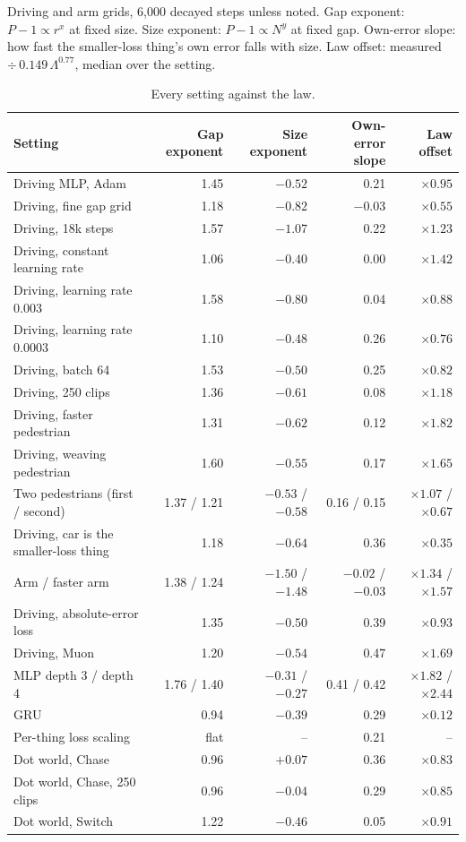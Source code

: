 \documentclass[11pt]{article}
\newcommand{\Lam}{\Lambda}
\begin{document}
Driving and arm grids, 6,000 decayed steps unless noted. Gap exponent: $P-1\propto r^x$ at fixed size. Size exponent: $P-1\propto N^y$ at fixed gap. Own-error slope: how fast the smaller-loss thing's own error falls with size. Law offset: measured $\div\, 0.149\,\Lam^{0.77}$, median over the setting.

\begin{table}[h]
\centering\small
\caption{Every setting against the law.}
\label{tab:appA}
\begin{tabular}{@{}lrrrr@{}}
\toprule
Setting & Gap exponent & Size exponent & Own-error slope & Law offset \\
\midrule
Driving MLP, Adam & 1.45 & $-0.52$ & 0.21 & $\times0.95$ \\
Driving, fine gap grid & 1.18 & $-0.82$ & $-0.03$ & $\times0.55$ \\
Driving, 18k steps & 1.57 & $-1.07$ & 0.22 & $\times1.23$ \\
Driving, constant learning rate & 1.06 & $-0.40$ & 0.00 & $\times1.42$ \\
Driving, learning rate 0.003 & 1.58 & $-0.80$ & 0.04 & $\times0.88$ \\
Driving, learning rate 0.0003 & 1.10 & $-0.48$ & 0.26 & $\times0.76$ \\
Driving, batch 64 & 1.53 & $-0.50$ & 0.25 & $\times0.82$ \\
Driving, 250 clips & 1.36 & $-0.61$ & 0.08 & $\times1.18$ \\
Driving, faster pedestrian & 1.31 & $-0.62$ & 0.12 & $\times1.82$ \\
Driving, weaving pedestrian & 1.60 & $-0.55$ & 0.17 & $\times1.65$ \\
Two pedestrians (first / second) & 1.37 / 1.21 & $-0.53$ / $-0.58$ & 0.16 / 0.15 & $\times1.07$ / $\times0.67$ \\
Driving, car is the smaller-loss thing & 1.18 & $-0.64$ & 0.36 & $\times0.35$ \\
Arm / faster arm & 1.38 / 1.24 & $-1.50$ / $-1.48$ & $-0.02$ / $-0.03$ & $\times1.34$ / $\times1.57$ \\
Driving, absolute-error loss & 1.35 & $-0.50$ & 0.39 & $\times0.93$ \\
Driving, Muon & 1.20 & $-0.54$ & 0.47 & $\times1.69$ \\
MLP depth 3 / depth 4 & 1.76 / 1.40 & $-0.31$ / $-0.27$ & 0.41 / 0.42 & $\times1.82$ / $\times2.44$ \\
GRU & 0.94 & $-0.39$ & 0.29 & $\times0.12$ \\
Per-thing loss scaling & flat & -- & 0.21 & -- \\
Dot world, Chase & 0.96 & $+0.07$ & 0.36 & $\times0.83$ \\
Dot world, Chase, 250 clips & 0.96 & $-0.04$ & 0.29 & $\times0.85$ \\
Dot world, Switch & 1.22 & $-0.46$ & 0.05 & $\times0.91$ \\
\bottomrule
\end{tabular}
\end{table}
\end{document}
